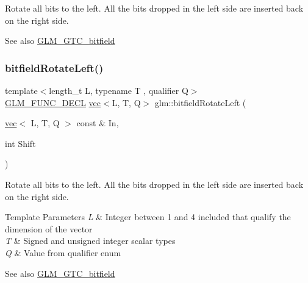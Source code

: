 Rotate all bits to the left. All the bits dropped in the left side are inserted back on the right side.

\begin{DoxySeeAlso}{See also}
\mbox{\hyperlink{group__gtc__bitfield}{G\+L\+M\+\_\+\+G\+T\+C\+\_\+bitfield}} 
\end{DoxySeeAlso}
\mbox{\label{group__gtc__bitfield_gae186317091b1a39214ebf79008d44a1e}} 
\subsubsection{\texorpdfstring{bitfield\+Rotate\+Left()}{bitfieldRotateLeft()}\hspace{0.1cm}{\footnotesize\ttfamily [2/2]}}
{\footnotesize\ttfamily template$<$length\+\_\+t L, typename T , qualifier Q$>$ \\
\mbox{\hyperlink{setup_8hpp_ab2d052de21a70539923e9bcbf6e83a51}{G\+L\+M\+\_\+\+F\+U\+N\+C\+\_\+\+D\+E\+CL}} \mbox{\hyperlink{structglm_1_1vec}{vec}}$<$L, T, Q$>$ glm\+::bitfield\+Rotate\+Left (\begin{DoxyParamCaption}\item[{\mbox{\hyperlink{structglm_1_1vec}{vec}}$<$ L, T, Q $>$ const \&}]{In,  }\item[{int}]{Shift }\end{DoxyParamCaption})}

Rotate all bits to the left. All the bits dropped in the left side are inserted back on the right side.


\begin{DoxyTemplParams}{Template Parameters}
{\em L} & Integer between 1 and 4 included that qualify the dimension of the vector \\
\hline
{\em T} & Signed and unsigned integer scalar types \\
\hline
{\em Q} & Value from qualifier enum\\
\hline
\end{DoxyTemplParams}
\begin{DoxySeeAlso}{See also}
\mbox{\hyperlink{group__gtc__bitfield}{G\+L\+M\+\_\+\+G\+T\+C\+\_\+bitfield}} 
\end{DoxySeeAlso}
\mbox{\label{group__gtc__bitfield_ga1c33d075c5fb8bd8dbfd5092bfc851ca}} 
